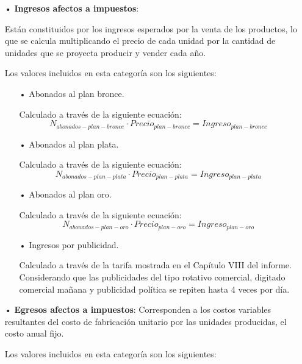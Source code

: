 \begin{enumerate}
\item[•]\textbf{Ingresos afectos a impuestos}:

Están constituidos por los ingresos esperados por la 
venta de los productos, lo que se calcula multiplicando el precio de cada unidad por 
la cantidad de unidades que se proyecta producir y vender cada año.

Los valores incluidos en esta categoría son los siguientes:
\begin{enumerate}
\item[•]Abonados al plan bronce.

Calculado a través de la siguiente ecuación:
\begin{equation}
N_{abonados-plan-bronce}\cdot Precio_{plan-bronce}=Ingreso_{plan-bronce}
\end{equation}

\item[•]Abonados al plan plata.

Calculado a través de la siguiente ecuación:
\begin{equation}
N_{abonados-plan-plata}\cdot Precio_{plan-plata}=Ingreso_{plan-plata}
\end{equation}

\item[•]Abonados al plan oro.

Calculado a través de la siguiente ecuación:
\begin{equation}
N_{abonados-plan-oro}\cdot Precio_{plan-oro}=Ingreso_{plan-oro}
\end{equation}

\item[•]Ingresos por publicidad.

Calculado a través de la tarifa mostrada en el Capítulo VIII del informe. Considerando que las publicidades del tipo
rotativo comercial, digitado comercial mañana y publicidad política se repiten hasta 4 veces por día.

\end{enumerate}

\item[•]\textbf{Egresos afectos a impuestos}:
Corresponden a los costos variables resultantes del 
costo de fabricación unitario por las unidades producidas, el costo anual fijo.

Los valores incluidos en esta categoría son los siguientes:
\begin{enumerate}
\item[•]Costo del servicio de internet mayorista.}


\end{enumerate}
\end{enumerate}
